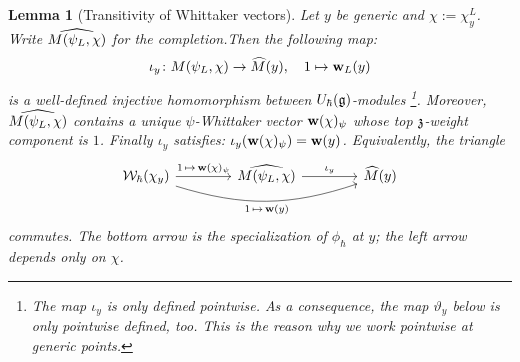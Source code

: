 \documentclass{article}
\theoremstyle{plain}
\newtheorem{lemma}[theorem]{Lemma}
\theoremstyle{definition}
\theoremstyle{remark}
\numberwithin{equation}{section}
\begin{document}
\begin{lemma}[Transitivity of Whittaker vectors]\label{lem:wv-trans}
Let $y$ be generic and $\chi:=\chi^L_y$. Write $\widehat{M(\psi_L,\chi)}$ for the completion.Then the following map:
\begin{equation*}
    \iota_y\colon M(\psi_L, \chi)\to\widehat M(y),\quad 1\mapsto\mathbf w_L(y)
\end{equation*}
is a well-defined injective homomorphism between $U_\hbar(\mathfrak{g})$-modules \footnote{The map $\iota_y$ is only defined pointwise. As a consequence, the map $\vartheta_y$ below is only pointwise defined, too. This is the reason why we work pointwise at generic points.}. Moreover, $\widehat{M(\psi_L,\chi)}$ contains a unique $\psi$-Whittaker vector $\mathbf w(\chi)_\psi$ whose top $\mathfrak{z}$-weight component is $1$. Finally $\iota_y$ satisfies: $\iota_y(\mathbf w(\chi)_\psi)=\mathbf w(y)$. Equivalently, the triangle
\begin{equation}\label{eq:wv-trans}
\begin{tikzcd}[column sep=4em]
\calW_\hbar(\chi_y)\arrow[r,"1\,\mapsto\,\wv(\chi)_\psi"]\arrow[rr,bend right=18,"1\,\mapsto\,\wv(y)"'] & \widehat{M(\psiL,\chi)}\arrow[r,"\iota_y"] & \widehat M(y)
\end{tikzcd}
\end{equation}
commutes. The bottom arrow is the specialization of $\phi_\hbar$ at $y$; the left arrow depends only on $\chi$.
\end{lemma}
\end{document}
